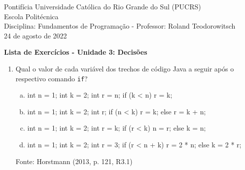 \documentclass[onecolumn,a4paper,10pt]{report}
\newcommand{\+}{\, + \,}
\newcommand{\<}{\hspace*{-0.4cm}}
\begin{document}
\singlespacing

\begin{center}
Pontifícia Universidade Católica do Rio Grande do Sul (PUCRS)\\
Escola Politécnica\\
Disciplina: Fundamentos de Programação - Professor: Roland Teodorowitsch\\
24 de agosto de 2022
\end{center}

\begin{center}
\textbf{Lista de Exercícios - Unidade 3: Decisões}
\end{center}

\begin{enumerate}[1.]

\item Qual o valor de cada variável dos trechos de código Java a seguir após o respectivo comando \texttt{if}?
\begin{enumerate}[a)]
\item
\begin{javacode}
int n = 1; int k = 2; int r = n;
if (k < n) { r = k; }
\end{javacode}
\item
\begin{javacode}
int n = 1; int k = 2; int r;
if (n < k) { r = k; }
else { r = k + n; }
\end{javacode}
\item
\begin{javacode}
int n = 1; int k = 2; int r = k;
if (r < k) { n = r; }
else { k = n; }
\end{javacode}
\item
\begin{javacode}
int n = 1; int k = 2; int r = 3;
if (r < n + k) { r = 2 * n; }
else { k = 2 * r; }
\end{javacode}
\end{enumerate}
{\tiny Fonte: Horstmann (2013, p. 121, R3.1)}


\end{enumerate}
\end{document}
